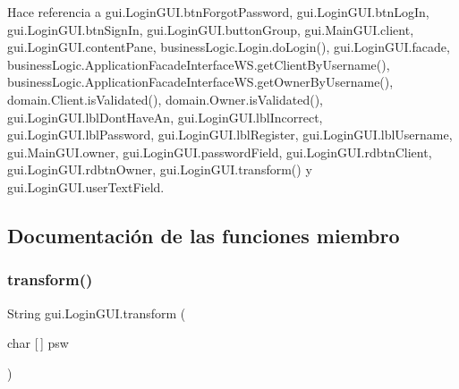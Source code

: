 \begin{DoxyCode}{0}

\end{DoxyCode}


Hace referencia a gui.\+Login\+G\+U\+I.\+btn\+Forgot\+Password, gui.\+Login\+G\+U\+I.\+btn\+Log\+In, gui.\+Login\+G\+U\+I.\+btn\+Sign\+In, gui.\+Login\+G\+U\+I.\+button\+Group, gui.\+Main\+G\+U\+I.\+client, gui.\+Login\+G\+U\+I.\+content\+Pane, business\+Logic.\+Login.\+do\+Login(), gui.\+Login\+G\+U\+I.\+facade, business\+Logic.\+Application\+Facade\+Interface\+W\+S.\+get\+Client\+By\+Username(), business\+Logic.\+Application\+Facade\+Interface\+W\+S.\+get\+Owner\+By\+Username(), domain.\+Client.\+is\+Validated(), domain.\+Owner.\+is\+Validated(), gui.\+Login\+G\+U\+I.\+lbl\+Dont\+Have\+An, gui.\+Login\+G\+U\+I.\+lbl\+Incorrect, gui.\+Login\+G\+U\+I.\+lbl\+Password, gui.\+Login\+G\+U\+I.\+lbl\+Register, gui.\+Login\+G\+U\+I.\+lbl\+Username, gui.\+Main\+G\+U\+I.\+owner, gui.\+Login\+G\+U\+I.\+password\+Field, gui.\+Login\+G\+U\+I.\+rdbtn\+Client, gui.\+Login\+G\+U\+I.\+rdbtn\+Owner, gui.\+Login\+G\+U\+I.\+transform() y gui.\+Login\+G\+U\+I.\+user\+Text\+Field.



\subsection{Documentación de las funciones miembro}
\mbox{\label{classgui_1_1_login_g_u_i_a75dfb4f95ca55f19138783c531c5d02c}} 
\subsubsection{\texorpdfstring{transform()}{transform()}}
{\footnotesize\ttfamily String gui.\+Login\+G\+U\+I.\+transform (\begin{DoxyParamCaption}\item[{char \mbox{[}$\,$\mbox{]}}]{psw }\end{DoxyParamCaption})}




